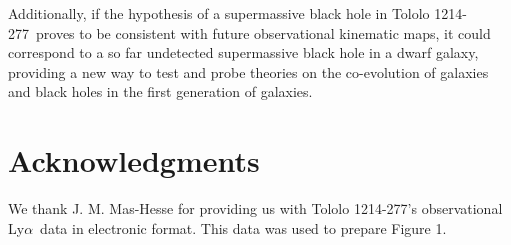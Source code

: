 \documentclass[a4,useAMS,usenatbib,usegraphicx]{mn2e}
\newcommand{\tol}{Tololo 1214-277}
\newcommand{\lya}{Ly$\alpha$}
\begin{document}
Additionally, if the hypothesis of a supermassive black
hole in \tol\ proves to be consistent with future observational
kinematic maps, it could correspond to a so far undetected
supermassive black hole in a dwarf galaxy, providing a new way to test
and probe theories on the co-evolution of galaxies and black holes in
the first generation of galaxies.   

\section*{Acknowledgments}
We thank J. M. Mas-Hesse for providing us with \tol's observational
\lya\ data \citep{mashesse03} in electronic format. This data was
used to prepare Figure 1.





\end{document}
